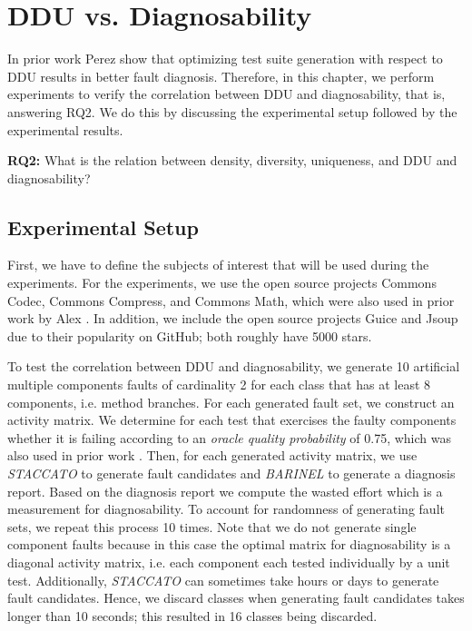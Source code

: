 \documentclass[twoside,a4paper,11pt]{memoir}
\begin{document}
\chapter{DDU vs. Diagnosability}
\label{ch:rq2}
In prior work Perez \etal \cite{DBLP:conf/icse/PerezAD17} show that optimizing test suite generation with respect to DDU results in better fault diagnosis.
Therefore, in this chapter, we perform experiments to verify the correlation between DDU and diagnosability, that is, answering RQ2.
We do this by discussing the experimental setup followed by the experimental results.

\begin{framed}
\noindent
\textbf{RQ2:} What is the relation between density, diversity, uniqueness, and DDU and diagnosability?
\end{framed}


\section{Experimental Setup}
\label{sec:rq2_experimental_setup}
First, we have to define the subjects of interest that will be used during the experiments.
For the experiments, we use the open source projects Commons Codec, Commons Compress, and Commons Math, which were also used in prior work by Alex \etal \cite{DBLP:conf/icse/PerezAD17}.
In addition, we include the open source projects Guice and Jsoup due to their popularity on GitHub; both roughly have 5000 stars.

To test the correlation between DDU and diagnosability, we generate 10 artificial multiple components faults of cardinality 2 for each class that has at least 8 components, i.e. method branches.
For each generated fault set, we construct an activity matrix.
We determine for each test that exercises the faulty components whether it is failing according to an \emph{oracle quality probability} of 0.75, which was also used in prior work \cite{DBLP:conf/icse/PerezAD17}.
Then, for each generated activity matrix, we use \emph{STACCATO} to generate fault candidates and \emph{BARINEL} to generate a diagnosis report.
Based on the diagnosis report we compute the wasted effort which is a measurement for diagnosability.
To account for randomness of generating fault sets, we repeat this process 10 times.
Note that we do not generate single component faults because in this case the optimal matrix for diagnosability is a diagonal activity matrix, i.e. each component each tested individually by a unit test.
Additionally, \emph{STACCATO} can sometimes take hours or days to generate fault candidates.
Hence, we discard classes when generating fault candidates takes longer than 10 seconds; this resulted in 16 classes being discarded.
\end{document}
